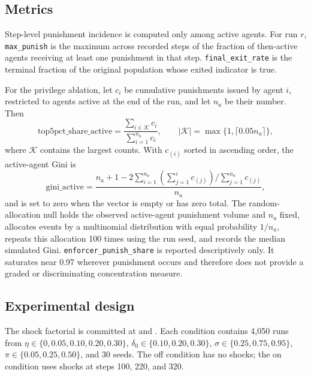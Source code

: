 \documentclass[12pt]{article}
\begin{document}
\subsection{Metrics}

Step-level punishment incidence is computed only among active agents. For run \(r\), \texttt{max\_punish} is the maximum across recorded steps of the fraction of then-active agents receiving at least one punishment in that step. \texttt{final\_exit\_rate} is the terminal fraction of the original population whose exited indicator is true.

For the privilege ablation, let \(c_i\) be cumulative punishments issued by agent \(i\), restricted to agents active at the end of the run, and let \(n_a\) be their number. Then
\begin{equation}
 \mathrm{top5pct\_share\_active}=\frac{\sum_{i\in\mathcal{K}}c_i}{\sum_{i=1}^{n_a}c_i},\qquad |\mathcal{K}|=\max\{1,\lceil0.05n_a\rceil\},
\end{equation}
where \(\mathcal{K}\) contains the largest counts. With \(c_{(i)}\) sorted in ascending order, the active-agent Gini is
\begin{equation}
 \mathrm{gini\_active}=\frac{n_a+1-2\sum_{i=1}^{n_a}\left(\sum_{j=1}^{i}c_{(j)}\right)/\sum_{j=1}^{n_a}c_{(j)}}{n_a},
\end{equation}
and is set to zero when the vector is empty or has zero total. The random-allocation null holds the observed active-agent punishment volume and \(n_a\) fixed, allocates events by a multinomial distribution with equal probability \(1/n_a\), repeats this allocation 100 times using the run seed, and records the median simulated Gini. \texttt{enforcer\_punish\_share} is reported descriptively only. It saturates near 0.97 wherever punishment occurs and therefore does not provide a graded or discriminating concentration measure.

\subsection{Experimental design}

The shock factorial is committed at  and . Each condition contains 4,050 runs from \(\eta\in\{0,\allowbreak 0.05,\allowbreak 0.10,\allowbreak 0.20,\allowbreak 0.30\}\), \(\delta_0\in\{0.10,0.20,0.30\}\), \(\sigma\in\{0.25,0.75,0.95\}\), \(\pi\in\{0.05,0.25,0.50\}\), and 30 seeds. The off condition has no shocks; the on condition uses shocks at steps 100, 220, and 320.
\end{document}
